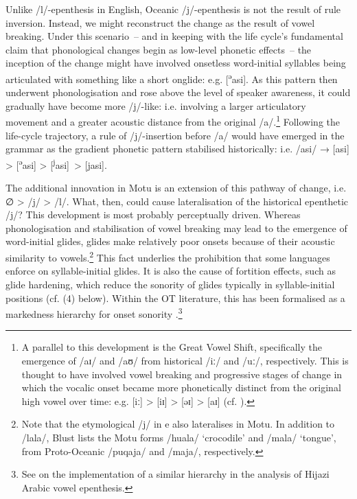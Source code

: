 \documentclass[output=paper,colorlinks,citecolor=brown]{langscibook}
\begin{document}
Unlike /l/-epenthesis in English, Oceanic /j/-epenthesis is not the result of rule inversion.  Instead, we might reconstruct the change as the result of vowel breaking.  Under this scenario~-- and in keeping with the life cycle's fundamental claim that phonological changes begin as low-level phonetic effects~-- the inception of the change might have involved onsetless word-initial syllables being articulated with something like a short onglide: e.g. [\textsuperscript{ə}asi].  As this pattern then underwent phonologisation and rose above the level of speaker awareness, it could gradually have become more /j/-like: i.e. involving a larger articulatory movement and a greater acoustic distance from the original /a/.\footnote{A parallel to this development is the Great Vowel Shift, specifically the emergence of /aɪ/ and /aʊ/ from historical /iː/ and /uː/, respectively.  This is thought to have involved vowel breaking and progressive stages of change in which the vocalic onset became more phonetically distinct from the original high vowel over time: e.g. [iː] > [iɪ] > [əɪ] > [aɪ] (cf. \citealt[246ff.]{Krug2017}).}  Following the life-cycle trajectory, a rule of /j/-insertion before /a/ would have emerged in the grammar as the gradient phonetic pattern stabilised historically: i.e. /asi/ → [asi] > [\textsuperscript{ə}asi] > [\textsuperscript{j}asi]~> [jasi].

The additional innovation in Motu is an extension of this pathway of change, i.e. ∅ > /j/ > /l/.  What, then, could cause lateralisation of the historical epenthetic /j/?  This development is most probably perceptually driven. Whereas phonologisation and stabilisation of vowel breaking may lead to the emergence of word-initial glides, glides make relatively poor onsets because of their acoustic similarity to vowels.\footnote{Note that the etymological /j/ in e also lateralises in Motu. In addition to /lala/, Blust lists the Motu forms /huala/ `crocodile' and /mala/ `tongue', from Proto-Oceanic /puqaja/ and /maja/, respectively.} This fact underlies the prohibition that some languages enforce on syllable-initial glides.  It is also the cause of fortition effects, such as glide hardening, which reduce the sonority of glides typically in syllable-initial positions (cf. (4) below).  Within the OT literature, this has been formalised as a markedness hierarchy for onset sonority \citep{Gopal2018, Gouskova2004}.\footnote{See  on the implementation of a similar hierarchy in the analysis of Hijazi Arabic vowel epenthesis.}
\end{document}
